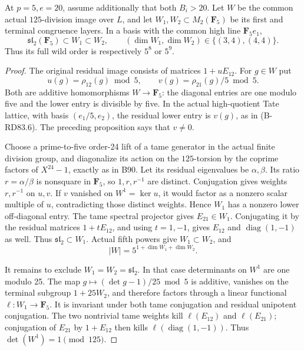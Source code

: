 \begin{theorem}
\label{thm:B-RD91-large}
At \(p=5,e=20\), assume additionally that both \(B_i>20\).
Let \(W\) be the common actual \(125\)-division image over \(L\),
and let \(W_1,W_2\subset M_2(\mathbf F_5)\) be its first and
terminal congruence layers. In a basis with the common high line
\(\mathbf F_5e_1\),
\[
 \mathfrak{sl}_2(\mathbf F_5)\subset W_1\subset W_2,
 \qquad (\dim W_1,\dim W_2)\in\{(3,4),(4,4)\}.
                                                        \tag{B-RD91.8}
\]
Thus its full wild order is respectively \(5^8\) or \(5^9\).
\end{theorem}
\begin{proof}
The original residual image consists of matrices
\(1+uE_{12}\). For \(g\in W\) put
\[
 u(g)=\rho_{12}(g)\bmod5,\qquad
 v(g)=\rho_{21}(g)/5\bmod5.                          \tag{B-RD91.9}
\]
Both are additive homomorphisms \(W\to\mathbf F_5\): the
diagonal entries are one modulo five and the lower entry is
divisible by five. In the actual high-quotient Tate lattice,
with basis \((e_1/5,e_2)\), the residual lower entry is \(v(g)\),
as in (B-RD83.6). The preceding proposition says that \(v\ne0\).

Choose a prime-to-five order-24 lift of a tame generator in the
actual finite division group, and diagonalize its action on the
\(125\)-torsion by the coprime factors of \(X^{24}-1\), exactly
as in B90. Let its residual eigenvalues be \(\alpha,\beta\).
Its ratio \(r=\alpha/\beta\) is nonsquare in \(\mathbf F_5\),
so \(1,r,r^{-1}\) are distinct. Conjugation gives weights
\(r,r^{-1}\) on \(u,v\). If \(v\) vanished on
\(W^1=\ker u\), it would factor as a nonzero scalar multiple
of \(u\), contradicting those distinct weights. Hence \(W_1\)
has a nonzero lower off-diagonal entry. The tame spectral
projector gives \(E_{21}\in W_1\). Conjugating it by the
residual matrices \(1+tE_{12}\), and using \(t=1,-1\), gives
\(E_{12}\) and \(\operatorname{diag}(1,-1)\) as well.
Thus \(\mathfrak{sl}_2\subset W_1\). Actual fifth powers give
\(W_1\subset W_2\), and
\[
                  |W|=5^{1+\dim W_1+\dim W_2}.        \tag{B-RD91.10}
\]

It remains to exclude \(W_1=W_2=\mathfrak{sl}_2\). In that
case determinants on \(W^1\) are one modulo 25. The map
\(g\mapsto(\det g-1)/25\bmod5\) is additive, vanishes on the
terminal subgroup \(1+25W_2\), and therefore factors through a
linear functional \(\ell:W_1\to\mathbf F_5\). It is invariant
under both tame conjugation and residual unipotent conjugation.
The two nontrivial tame weights kill \(\ell(E_{12})\) and
\(\ell(E_{21})\); conjugation of \(E_{21}\) by \(1+E_{12}\)
then kills \(\ell(\operatorname{diag}(1,-1))\). Thus
\(\det(W^1)=1\pmod{125}\).


\end{proof}
